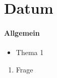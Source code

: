 \section*{Datum}

\paragraph{Allgemein}
\begin{itemize}
	\item Thema 1
\end{itemize}

\begin{enumerate}
	\item Frage
\end{enumerate}